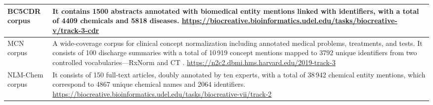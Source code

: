 \begin{table}[!tb]
\begin{tabular}{E{0.30\textwidth}p{0.62\textwidth}}
\midrule

BC5CDR corpus\newline
{}
& It contains 1500  abstracts annotated with biomedical entity mentions linked with  identifiers, with a total of 4409 chemicals and 5818 diseases.\newline
{\footnotesize\url{https://biocreative.bioinformatics.udel.edu/tasks/biocreative-v/track-3-cdr}}
\\

\midrule

MCN corpus\newline
{}
&
A wide-coverage corpus for clinical concept normalization including annotated medical problems, treatments, and tests. It consists of 100 discharge summaries with a total of 10\,919 concept mentions mapped to 3792 unique identifiers from two controlled vocabularies---RxNorm \parencite{liu2005a,nelson2011a} and  CT \parencite{cote1986a,stearns2001a,cornet2008a,bodenreider2018a}.\newline
{\footnotesize\url{https://n2c2.dbmi.hms.harvard.edu/2019-track-3}}
\\

\midrule

NLM-Chem corpus\newline
{}
& It consists of 150 full-text  articles, doubly annotated by ten  experts, with a total of 38\,942 chemical entity mentions, which correspond to 4867 unique chemical names and 2064  identifiers.\newline
{\footnotesize\url{https://biocreative.bioinformatics.udel.edu/tasks/biocreative-vii/track-2}}
\\

\bottomrule

\end{tabular}
\end{table}
\endgroup
